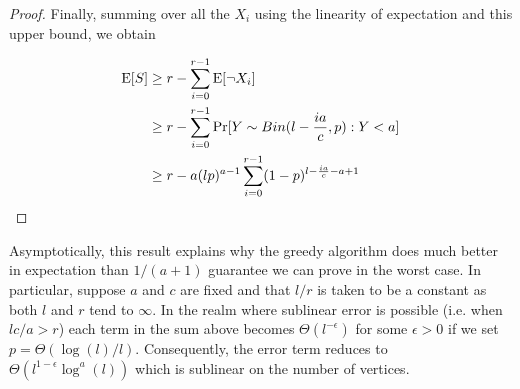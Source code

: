 \begin{proof}
Finally, summing over all the $X_i$ using the linearity of
expectation and this upper bound, we obtain

\begin{align*}
      \text{E}[S]
&\geq r - \sum_{i=0}^{r-1} \text{E}[\lnot X_i] \\
&\geq r - \sum_{i=0}^{r-1} \Pr[Y \sim Bin(l-\frac{ia}{c},p): Y < a] \\
&\geq r - a(lp)^{a-1}\sum_{i=0}^{r-1}(1-p)^{l-\frac{ia}{c}-a+1}
\end{align*}
\end{proof}

Asymptotically, this result explains why the greedy
algorithm does much better in expectation than $1/(a+1)$ guarantee we
can prove in the worst case.
In particular, suppose $a$ and $c$ are fixed and that
$l/r$ is taken to be a constant as both $l$ and $r$ tend to $\infty$. In the realm where sublinear error is possible (i.e. when $lc/a>r$) each term in the sum above becomes $\Theta(l^{-\epsilon})$ for some $\epsilon>0$ if we set $p=\Theta(\log(l)/l)$. Consequently, the error term reduces to $\Theta(l^{1-\epsilon}\log^a(l))$ which is sublinear on the number of vertices.
